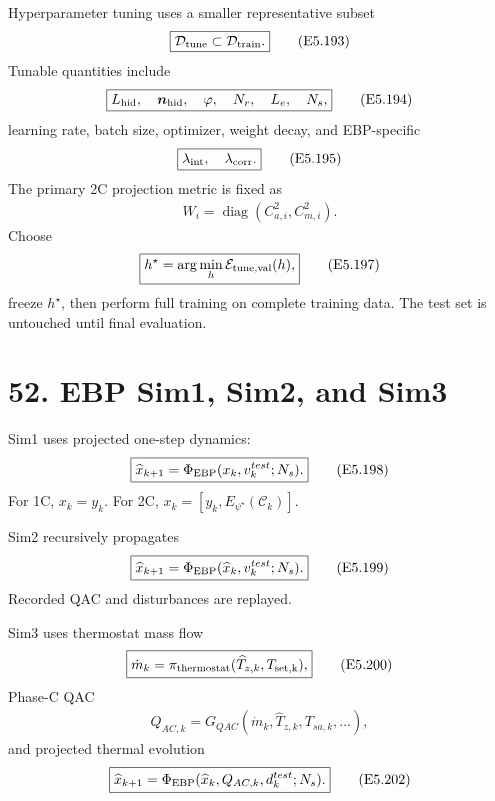 \documentclass[11pt]{article}
\begin{document}
Hyperparameter tuning uses a smaller representative subset
\begin{align}
\boxed{\mathcal D_{\rm tune}\subset\mathcal D_{\rm train}.}
\tag{E5.193}
\end{align}
Tunable quantities include
\begin{align}
\boxed{L_{\rm hid},\quad\bm n_{\rm hid},\quad\varphi,\quad N_r,\quad L_e,\quad N_s,}
\tag{E5.194}
\end{align}
learning rate, batch size, optimizer, weight decay, and EBP-specific
\begin{align}
\boxed{\lambda_{\rm int},\quad\lambda_{\rm corr}.}
\tag{E5.195}
\end{align}
The primary 2C projection metric is fixed as
\begin{align}
\boxed{W_i=\operatorname{diag}(C_{a,i}^2,C_{m,i}^2).}
\tag{E5.196}
\end{align}
Choose
\begin{align}
\boxed{h^\star=\arg\min_h\mathcal E_{\rm tune,val}(h),}
\tag{E5.197}
\end{align}
freeze \(h^\star\), then perform full training on complete training data. The test set is untouched until final evaluation.

\section*{52. EBP Sim1, Sim2, and Sim3}

Sim1 uses projected one-step dynamics:
\begin{align}
\boxed{\widehat x_{k+1}=\Phi_{\rm EBP}(x_k,v_k^{test};N_s).}
\tag{E5.198}
\end{align}
For 1C, \(x_k=y_k\). For 2C, \(x_k=[y_k,E_{\psi^\star}(\mathcal C_k)]\).

Sim2 recursively propagates
\begin{align}
\boxed{\widehat x_{k+1}=\Phi_{\rm EBP}(\widehat x_k,v_k^{test};N_s).}
\tag{E5.199}
\end{align}
Recorded QAC and disturbances are replayed.

Sim3 uses thermostat mass flow
\begin{align}
\boxed{\dot m_k=\pi_{\rm thermostat}(\widehat T_{z,k},T_{\rm set,k}),}
\tag{E5.200}
\end{align}
Phase-C QAC
\begin{align}
\boxed{Q_{AC,k}=G_{QAC}(\dot m_k,\widehat T_{z,k},T_{sa,k},\ldots),}
\tag{E5.201}
\end{align}
and projected thermal evolution
\begin{align}
\boxed{\widehat x_{k+1}=\Phi_{\rm EBP}(\widehat x_k,Q_{AC,k},d_k^{test};N_s).}
\tag{E5.202}
\end{align}
\end{document}
